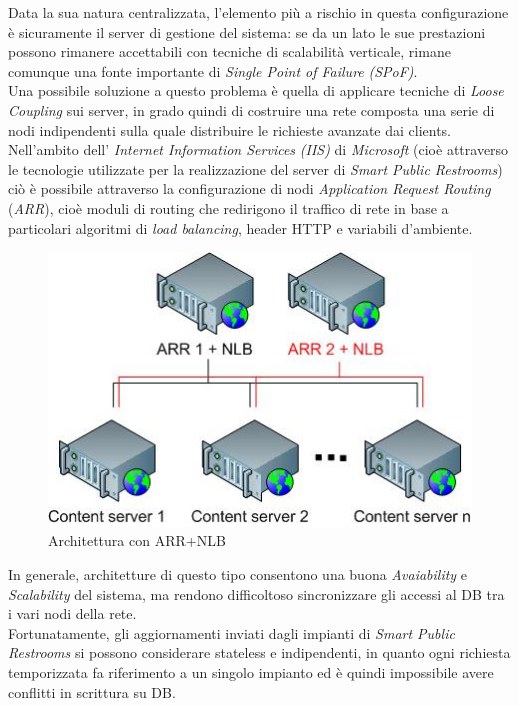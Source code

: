 \documentclass[12pt]{article}
\begin{document}
Data la sua natura centralizzata, l'elemento più a rischio in questa configurazione è sicuramente il server di gestione del sistema: se da un lato le sue prestazioni possono rimanere accettabili con tecniche di scalabilità verticale, rimane comunque una fonte importante di \textit{Single Point of Failure} \textit{(SPoF)}.\\
Una possibile soluzione a questo problema è quella di applicare tecniche di \textit{Loose Coupling} sui server, in grado quindi di costruire una rete composta una serie di nodi indipendenti sulla quale distribuire le richieste avanzate dai clients.\\
Nell'ambito dell' \textit{Internet Information Services} \textit{(IIS)} di \textit{Microsoft} (cioè attraverso le tecnologie utilizzate per la realizzazione del server di \textit{Smart Public Restrooms}) ciò è possibile attraverso la configurazione di nodi  \textit{Application Request Routing} (\textit{ARR}), cioè moduli di routing che redirigono il traffico di rete in base a particolari algoritmi di \textit{load balancing}, header HTTP e variabili d'ambiente.
\begin{figure}[h!]
\centering
  \includegraphics[scale=0.80]{img/ARR.png}
  \caption{Architettura con ARR+NLB}
\end{figure}
\newpage
In generale, architetture di questo tipo consentono una buona \textit{Avaiability} e \textit{Scalability} del sistema, ma rendono difficoltoso sincronizzare gli accessi al DB tra i vari nodi della rete.\\
Fortunatamente, gli aggiornamenti inviati dagli impianti di \textit{Smart Public Restrooms} si possono considerare stateless e indipendenti, in quanto ogni richiesta temporizzata fa riferimento a un singolo impianto ed è quindi impossibile avere conflitti in scrittura su DB.\\\\
\end{document}
